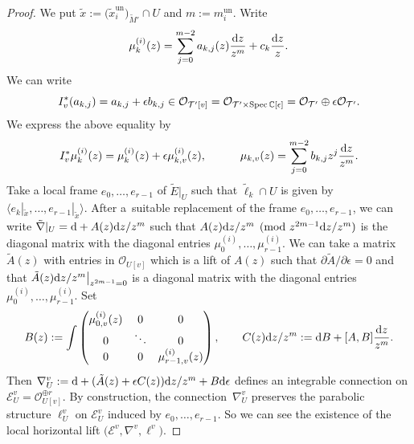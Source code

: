 \documentclass[pdftex]{sigma}
\numberwithin{equation}{section}
\newcommand\Spec{\mathop{\rm Spec}\nolimits}
\begin{document}
\begin{proof}
We put $\tilde{x}:=\big(\tilde{x}^{\mathrm{un}}_i\big)_{\tilde{M}'}\cap U$
and $m:=m^{\mathrm{un}}_i$.
Write
\[
 \mu^{(i)}_k(z)=\sum_{j=0}^{m-2} a_{k,j}(z) \frac {{\rm d}z} {z^m} +c_k \frac {{\rm d}z}{z}.
\]
We can write
\[
 I_v^*(a_{k,j})=
 a_{k,j}+\epsilon b_{k,j}
 \in {\mathcal O}_{{\mathcal T'}[v]}
 ={\mathcal O}_{{\mathcal T'}\times\Spec\mathbb{C}[\epsilon]}
 ={\mathcal O}_{\mathcal T'}\oplus \epsilon{\mathcal O}_{\mathcal T'}.
\]
We express the above equality by
\[
 I_v^*\mu^{(i)}_k(z)=
 \mu^{(i)}_k(z)+\epsilon \mu^{(i)}_{k,v}(z),
 \hspace{30pt}
 \mu_{k,v}(z)=
 \sum_{j=0}^{m-2}b_{k,j}z^j \frac{{\rm d}z}{z^m}.
\]
Take a local frame $e_0,\dots,e_{r-1}$ of $\tilde{E}|_U$
such that $\tilde{\ell}_k\cap U$ is given by
$\langle e_k|_{\tilde{x}},\dots,e_{r-1}|_{\tilde{x}}\rangle$.
After a~suitable replacement of the frame $e_0,\dots,e_{r-1}$,
we can write
$\tilde{\nabla}|_U={\rm d}+A(z){\rm d}z/z^m$
such that
$A(z){\rm d}z/z^m \pmod{z^{2m-1}{\rm d}z/z^m}$ is the diagonal matrix
with the diagonal entries
$\mu^{(i)}_0,\dots,\mu^{(i)}_{r-1}$.
We can take a matrix $\tilde{A}(z)$ with entries in ${\mathcal O}_{U[v]}$
which is a lift of $A(z)$ such that
$\partial \tilde{A}/\partial \epsilon=0$
and that
$\tilde{A}(z){\rm d}z/z^m\big|_{z^{2m-1}=0}$
is a diagonal matrix with the diagonal entries
$\mu^{(i)}_0,\dots,\mu^{(i)}_{r-1}$.
Set
\[
 B(z):=\int
 \begin{pmatrix}
 \mu^{(i)}_{0,v}(z) & 0 & 0 \\
 0 & \ddots & 0 \\
 0 & 0 & \mu^{(i)}_{r-1,v}(z)
 \end{pmatrix},
 \qquad
 C(z){\rm d}z/z^m
 :=
 {\rm d}B+[A,B]\frac{{\rm d}z}{z^m}.
\]
Then $\nabla^v_U:={\rm d}+(\tilde{A}(z)+\epsilon C(z)){\rm d}z/z^m+B{\rm d}\epsilon$
defines an integrable connection on
${\mathcal E}^v_U={\mathcal O}_{U[v]}^{\oplus r}$.
By construction, the connection~$\nabla^v_U$
preserves the parabolic structure $\ell^v_U$ on
${\mathcal E}^v_U$ induced by $e_0,\dots,e_{r-1}$.
So we can see the existence of the local horizontal lift
$\big({\mathcal E}^v,\nabla^v,\ell^v\big)$.


\end{proof}
\end{document}
